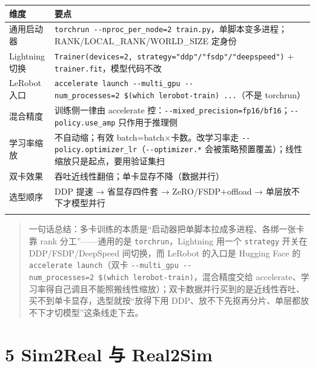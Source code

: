\documentclass[
  chinese,
]{ctexart}
\begin{document}
\begin{center}
\begin{tabular}{@{}>{\raggedright\arraybackslash}p{} >{\raggedright\arraybackslash}p{}@{}}
\toprule\noalign{}
维度 & 要点 \\
\midrule\noalign{}
通用启动器 & \texttt{torchrun\ -\/-nproc\_\allowbreak per\_\allowbreak node=2\ train.py}，单脚本变多进程；RANK/LOCAL\_\allowbreak RANK/WORLD\_\allowbreak SIZE 定身份 \\
Lightning 切换 & \texttt{Trainer(devices=2,\ strategy="ddp"/"fsdp"/"deepspeed")} + \texttt{trainer.fit}，模型代码不改 \\
LeRobot 入口 & \texttt{accelerate\ launch\ -\/-multi\_\allowbreak gpu\ -\/-num\_\allowbreak processes=2\ \$(which\ lerobot-train)\ ...}（不是 torchrun） \\
混合精度 & 训练侧一律由 accelerate 控：\texttt{-\/-mixed\_\allowbreak precision=fp16/bf16}；\texttt{-\/-policy.use\_\allowbreak amp} 只作用于推理侧 \\
学习率缩放 & 不自动缩；有效 batch=batch×卡数。改学习率走 \texttt{-\/-policy.optimizer\_\allowbreak lr}（\texttt{-\/-optimizer.*} 会被策略预置覆盖）；线性缩放只是起点，要用验证集扫 \\
双卡效果 & 吞吐近线性翻倍；单卡显存不降（数据并行） \\
选型顺序 & DDP 提速 → 省显存四件套 → ZeRO/FSDP+offload → 单层放不下才模型并行 \\
\bottomrule\noalign{}
\end{tabular}
\end{center}

\begin{quote}
一句话总结：多卡训练的本质是``启动器把单脚本拉成多进程、各绑一张卡靠
rank 分工''------通用的是 \texttt{torchrun}，Lightning 用一个
\texttt{strategy} 开关在 DDP/FSDP/DeepSpeed 间切换，而 LeRobot 的入口是
Hugging Face 的 \texttt{accelerate\ launch}（双卡
\texttt{-\/-multi\_gpu\ -\/-num\_processes=2\ \$(which\ lerobot-train)}，混合精度交给
accelerate、学习率得自己调且不能照搬线性缩放）；双卡数据并行买到的是近线性吞吐、买不到单卡显存，选型就按``放得下用
DDP、放不下先抠再分片、单层都放不下才切模型''这条线走下去。
\end{quote}

\section{5 Sim2Real 与 Real2Sim}\label{sim2real-ux4e0e-real2sim}
\end{document}
